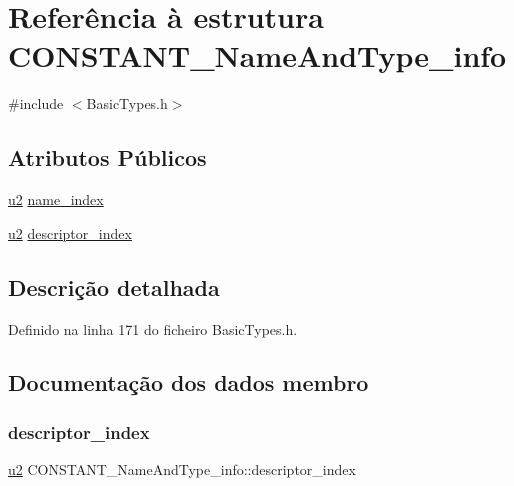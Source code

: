\hypertarget{structCONSTANT__NameAndType__info}{}\section{Referência à estrutura C\+O\+N\+S\+T\+A\+N\+T\+\_\+\+Name\+And\+Type\+\_\+info}
\label{structCONSTANT__NameAndType__info}


{\ttfamily \#include $<$Basic\+Types.\+h$>$}

\subsection*{Atributos Públicos}
\begin{DoxyCompactItemize}
\item 
\hyperlink{BasicTypes_8h_a732cde1300aafb73b0ea6c2558a7a54f}{u2} \hyperlink{structCONSTANT__NameAndType__info_adbaa813f9f3a32dc04a8bc65b5b2433d}{name\+\_\+index}
\item 
\hyperlink{BasicTypes_8h_a732cde1300aafb73b0ea6c2558a7a54f}{u2} \hyperlink{structCONSTANT__NameAndType__info_a5066151677d138f5ee57e5e16efd4d5e}{descriptor\+\_\+index}
\end{DoxyCompactItemize}


\subsection{Descrição detalhada}


Definido na linha 171 do ficheiro Basic\+Types.\+h.



\subsection{Documentação dos dados membro}
\mbox{\label{structCONSTANT__NameAndType__info_a5066151677d138f5ee57e5e16efd4d5e}} 
\subsubsection{\texorpdfstring{descriptor\+\_\+index}{descriptor\_index}}
{\footnotesize\ttfamily \hyperlink{BasicTypes_8h_a732cde1300aafb73b0ea6c2558a7a54f}{u2} C\+O\+N\+S\+T\+A\+N\+T\+\_\+\+Name\+And\+Type\+\_\+info\+::descriptor\+\_\+index}



